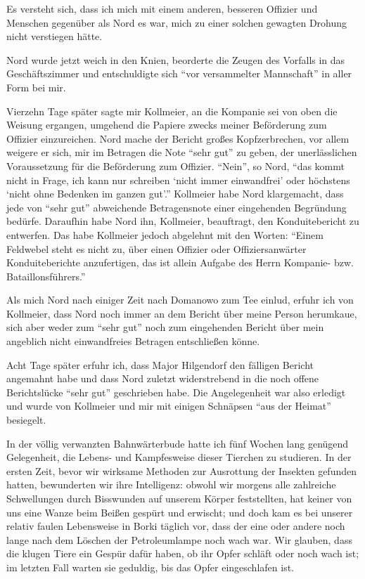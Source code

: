 \documentclass[a5paper,pagesize,10pt,twoside=true]{scrbook}
\begin{document}
Es versteht sich, dass ich mich mit einem anderen, besseren Offizier und Menschen gegenüber als Nord es war, mich zu einer solchen gewagten Drohung nicht verstiegen hätte.

Nord wurde jetzt weich in den Knien, beorderte die Zeugen des Vorfalls in das Geschäftszimmer und entschuldigte sich \enquote{vor versammelter Mannschaft} in aller Form bei mir.

Vierzehn Tage später sagte mir Kollmeier, an die Kompanie sei von oben die Weisung ergangen, umgehend die Papiere zwecks meiner Beförderung zum Offizier einzureichen. Nord mache der Bericht großes Kopfzerbrechen, vor allem weigere er sich, mir im Betragen die Note \enquote{sehr gut} zu geben, der unerlässlichen Voraussetzung für die Beförderung zum Offizier. \enquote{Nein}, so Nord, \enquote{das kommt nicht in Frage, ich kann nur schreiben \enquote{nicht immer einwandfrei} oder höchstens \enquote{nicht ohne Bedenken im ganzen gut}.} Kollmeier habe Nord klargemacht, dass jede von \enquote{sehr gut} abweichende Betragensnote einer eingehenden Begründung bedürfe. Daraufhin habe Nord ihn, Kollmeier, beauftragt, den Konduitebericht zu entwerfen. Das habe Kollmeier jedoch abgelehnt mit den Worten: \enquote{Einem Feldwebel steht es nicht zu, über einen Offizier oder Offiziersanwärter Konduiteberichte anzufertigen, das ist allein Aufgabe des Herrn Kompanie- bzw. Bataillonsführers.}

Als mich Nord nach einiger Zeit nach Domanowo zum Tee einlud, erfuhr ich von Kollmeier, dass Nord noch immer an dem Bericht über meine Person herumkaue, sich aber weder zum \enquote{sehr gut} noch zum eingehenden Bericht über mein angeblich nicht einwandfreies Betragen entschließen könne.

Acht Tage später erfuhr ich, dass Major Hilgendorf den fälligen Bericht angemahnt habe und dass Nord zuletzt widerstrebend in die noch offene Berichtslücke \enquote{sehr gut} geschrieben habe. Die Angelegenheit war also erledigt und wurde von Kollmeier und mir mit einigen Schnäpsen \enquote{aus der Heimat} besiegelt.

In der völlig verwanzten Bahnwärterbude hatte ich fünf Wochen lang genügend Gelegenheit, die Lebens- und Kampfesweise dieser Tierchen zu studieren. In der ersten Zeit, bevor wir wirksame Methoden zur Ausrottung der Insekten gefunden hatten, bewunderten wir ihre Intelligenz: obwohl wir morgens alle zahlreiche Schwellungen durch Bisswunden auf unserem Körper feststellten, hat keiner von uns eine Wanze beim Beißen gespürt und erwischt; und doch kam es bei unserer relativ faulen Lebensweise in Borki täglich vor, dass der eine oder andere noch lange nach dem Löschen der Petroleumlampe noch wach war. Wir glauben, dass die klugen Tiere ein Gespür dafür haben, ob ihr Opfer schläft oder noch wach ist; im letzten Fall warten sie geduldig, bis das Opfer eingeschlafen ist.
\end{document}

